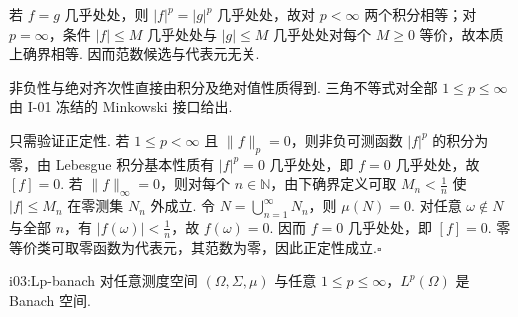 \begin{FAProof}
若 \(\displaystyle f=g\) 几乎处处，则 \(\displaystyle |f|^p=|g|^p\) 几乎处处，故对 \(\displaystyle p<\infty\) 两个积分相等；对 \(\displaystyle p=\infty\)，条件 \(\displaystyle |f|\leqslant M\) 几乎处处与 \(\displaystyle |g|\leqslant M\) 几乎处处对每个 \(\displaystyle M\geqslant0\) 等价，故本质上确界相等. 因而范数候选与代表元无关.

非负性与绝对齐次性直接由积分及绝对值性质得到. 三角不等式对全部 \(\displaystyle 1\leqslant p\leqslant\infty\) 由 I-01 冻结的 Minkowski 接口给出.

只需验证正定性. 若 \(\displaystyle 1\leqslant p<\infty\) 且 \(\displaystyle \|f\|_p=0\)，则非负可测函数 \(\displaystyle |f|^p\) 的积分为零，由 Lebesgue 积分基本性质有 \(\displaystyle |f|^p=0\) 几乎处处，即 \(\displaystyle f=0\) 几乎处处，故 \(\displaystyle [f]=0\). 若 \(\displaystyle \|f\|_\infty=0\)，则对每个 \(\displaystyle n\in\mathbb N\)，由下确界定义可取 \(\displaystyle M_n<\frac{1}{n}\) 使 \(\displaystyle |f|\leqslant M_n\) 在零测集 \(\displaystyle N_n\) 外成立. 令 \(\displaystyle N=\bigcup_{n=1}^{\infty}N_n\)，则 \(\displaystyle \mu(N)=0\). 对任意 \(\displaystyle \omega\notin N\) 与全部 \(\displaystyle n\)，有 \(\displaystyle |f(\omega)|<\frac{1}{n}\)，故 \(\displaystyle f(\omega)=0\). 因而 \(\displaystyle f=0\) 几乎处处，即 \(\displaystyle [f]=0\). 零等价类可取零函数为代表元，其范数为零，因此正定性成立.\hfill\(\square\)
\end{FAProof}

\begin{FATheorem}{i03:Lp-banach}
对任意测度空间 \(\displaystyle (\Omega,\Sigma,\mu)\) 与任意 \(\displaystyle 1\leqslant p\leqslant\infty\)，\(\displaystyle L^p(\Omega)\) 是 Banach 空间.
\end{FATheorem}

